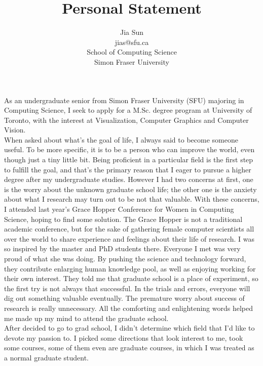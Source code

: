 \documentclass{article}
\title{Personal Statement}
\author{Jia Sun\\jias@sfu.ca\\School of Computing Science\\Simon Fraser University}
\begin{document}
\maketitle%

As an undergraduate senior from Simon Fraser University (SFU) majoring in Computing Science, I seek to apply for a M.Sc. degree program at University of Toronto, with the interest at Visualization, Computer Graphics and Computer Vision. \\


When asked about what’s the goal of life, I always said to become someone useful. To be more specific, it is to be a person who can improve the world, even though just a tiny little bit. Being proficient in a particular field is the first step to fulfill the goal, and that’s the primary reason that I eager to pursue a higher degree after my undergraduate studies. However I had two concerns at first, one is the worry about the unknown graduate school life; the other one is the anxiety about what I research may turn out to be not that valuable. With these concerns, I attended last year’s Grace Hopper Conference for Women in Computing Science, hoping to find some solution. The Grace Hopper is not a traditional academic conference, but for the sake of gathering female computer scientists all over the world to share experience and feelings about their life of research. I was so inspired by the master and PhD students there. Everyone I met was very proud of what she was doing. By pushing the science and technology forward, they contribute enlarging human knowledge pool, as well as enjoying working for their own interest. They told me that graduate school is a place of experiment, so the first try is not always that successful. In the trials and errors, everyone will dig out something valuable eventually. The premature worry about success of research is really unnecessary. All the comforting and enlightening words helped me made up my mind to attend the graduate school.  \\


After decided to go to grad school, I didn’t determine which field that I’d like to devote my passion to. I picked some directions that look interest to me, took some courses, some of them even are graduate courses, in which I was treated as a normal graduate student.\\
\end{document}
